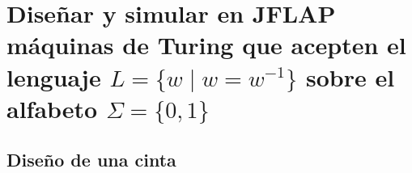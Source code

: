 \documentclass[11pt]{report}
\begin{document}







\newpage

\section{Diseñar y simular en JFLAP máquinas de Turing que acepten el lenguaje \(L = \{w \mid w = w^{-1}\}\) sobre el alfabeto \(\Sigma = \{0, 1\}\)}
\subsection{Diseño de una cinta}
\end{document}
